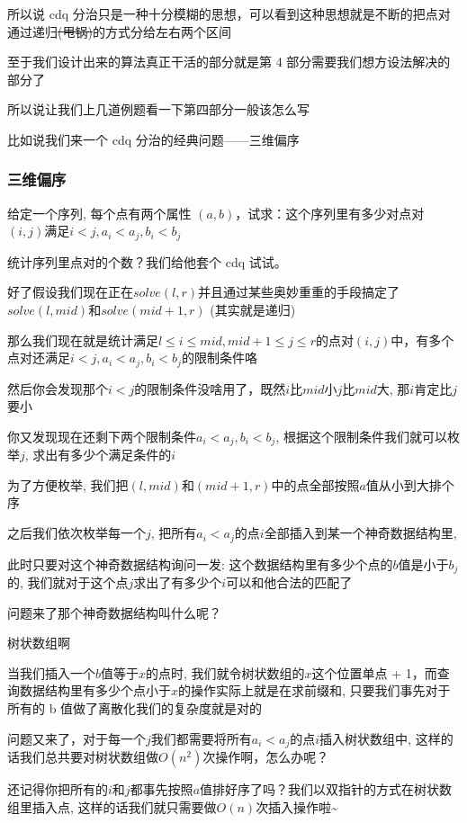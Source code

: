 所以说 cdq 分治只是一种十分模糊的思想，可以看到这种思想就是不断的把点对通过递归\st{(甩锅)}的方式分给左右两个区间

至于我们设计出来的算法真正干活的部分就是第 4 部分需要我们想方设法解决的部分了

所以说让我们上几道例题看一下第四部分一般该怎么写

比如说我们来一个 cdq 分治的经典问题——三维偏序

\subsubsection{三维偏序}

给定一个序列, 每个点有两个属性 $(a,b)$，试求：这个序列里有多少对点对$(i,j)$满足$i<j,a_{i}<a_{j},b_{i}<b_{j}$

统计序列里点对的个数？我们给他套个 cdq 试试。

好了假设我们现在正在$solve(l,r)$并且通过某些奥妙重重的手段搞定了$solve(l,mid)$和$solve(mid+1,r)$ (其实就是递归)

那么我们现在就是统计满足$l \leq i \leq mid,mid+1 \leq j \leq r$的点对$(i,j)$中，有多个点对还满足$i<j,a_{i}<a_{j},b_{i}<b_{j}$的限制条件咯

然后你会发现那个$i<j$的限制条件没啥用了，既然$i$比$mid$小$j$比$mid$大, 那$i$肯定比$j$要小

你又发现现在还剩下两个限制条件$a_{i}<a_{j},b_{i}<b_{j}$, 根据这个限制条件我们就可以枚举$j$, 求出有多少个满足条件的$i$

为了方便枚举, 我们把$(l,mid)$和$(mid+1,r)$中的点全部按照$a$值从小到大排个序

之后我们依次枚举每一个$j$, 把所有$a_{i}<a_{j}$的点$i$全部插入到某一个神奇数据结构里,

此时只要对这个神奇数据结构询问一发: 这个数据结构里有多少个点的$b$值是小于$b_{j}$的, 我们就对于这个点$j$求出了有多少个$i$可以和他合法的匹配了

问题来了那个神奇数据结构叫什么呢？

树状数组啊

当我们插入一个$b$值等于$x$的点时, 我们就令树状数组的$x$这个位置单点 + 1，而查询数据结构里有多少个点小于$x$的操作实际上就是在求前缀和, 只要我们事先对于所有的 b 值做了离散化我们的复杂度就是对的

问题又来了，对于每一个$j$我们都需要将所有$a_{i}<a_{j}$的点$i$插入树状数组中, 这样的话我们总共要对树状数组做$O(n^2)$次操作啊，怎么办呢？

还记得你把所有的$i$和$j$都事先按照$a$值排好序了吗？我们以双指针的方式在树状数组里插入点, 这样的话我们就只需要做$O(n)$次插入操作啦\textasciitilde{}

